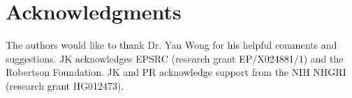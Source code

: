 \documentclass[10pt,twoside,lineno]{gsajnl}
\begin{document}

\section{Acknowledgments}
The authors would like to thank Dr. Yan Wong for his helpful comments and suggestions.
JK acknowledges EPSRC (research grant EP/X024881/1)
and the Robertson Foundation.
JK and PR acknowledge support from 
the NIH NHGRI (research grant HG012473).



\appendix
\renewcommand{\thefigure}{S\arabic{figure}}
\renewcommand{\thetable}{S\arabic{table}}
\setcounter{figure}{0}
\end{document}
